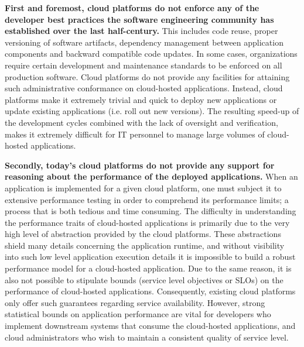 \textbf{First and foremost, cloud platforms do not enforce any of the developer best practices
the software engineering community has established over the last half-century.} This
includes code reuse, proper versioning of software artifacts, dependency management
between application components and backward compatible code updates. In
some cases, organizations require certain development and maintenance standards to be enforced on
all production software. Cloud platforms do not provide any facilities for attaining
such administrative conformance on cloud-hosted applications. Instead, cloud platforms
make it extremely trivial and quick to deploy new applications or update existing
applications (i.e. roll out new versions). The resulting speed-up of the development cycles combined with the lack of 
oversight and verification, makes it extremely difficult for 
IT personnel to manage large volumes of cloud-hosted applications.

\textbf{Secondly, today's cloud platforms do not provide any support for reasoning about the 
performance of the deployed applications.} When an application is implemented for
a given cloud platform, one must subject it to extensive performance testing in order
to comprehend its performance limits; a process that is both 
tedious and time consuming. The difficulty in understanding the performance 
traits of cloud-hosted applications is primarily due to the very high level of 
abstraction provided by the cloud platforms. These abstractions shield many details 
concerning the application runtime, and without visibility into such low level application 
execution details it is impossible
to build a robust performance model for a cloud-hosted application. Due to the same
reason, it is also not possible to stipulate bounds (service level objectives or SLOs) on
the performance of cloud-hosted applications. 
Consequently, existing cloud platforms only offer such guarantees regarding service availability.
However, strong statistical bounds on application performance are vital for developers 
who implement downstream systems that consume the cloud-hosted applications,
and cloud administrators who wish to maintain a consistent quality of service
level.

